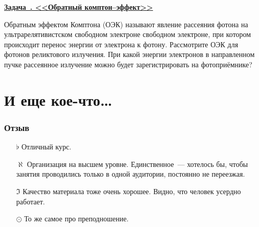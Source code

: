 \documentclass[11pt]{article}
\theoremstyle{definition}\newtheorem{defi}{Определение}
\newcounter{taskn}[section]
\newenvironment{task}[1]{%
\begin{framed}
  \noindent
  \underline{\bfseries Задача~\stepcounter{taskn}\thetaskn. <<#1>>}
  \setlength{\parindent}{0cm}
}{%
\end{framed}
}
\begin{document}
\begin{task}{Обратный комптон--эффект}

Обратным эффектом Комптона (ОЭК) называют явление рассеяния фотона на ультрарелятивистском свободном электроне свободном электроне, при котором происходит перенос энергии от электрона к фотону. Рассмотрите ОЭК для фотонов реликтового излучения. При какой энергии электронов в направленном пучке рассеянное излучение можно будет зарегистрировать на фотоприёмнике?

\end{task}


\part{И еще кое-что\dots}

\section{Отзыв}

\begin{itemize}

\item[$\flat$] Отличный курс.
\item[$\aleph$] Организация на высшем уровне. Единственное~--- хотелось бы, чтобы занятия проводились только в одной аудитории, постоянно не переезжая.
\item[$\Im$] Качество материала тоже очень хорошее. Видно, что человек усердно работает.
\item[$\odot$] То же самое про преподношение.

\end{itemize}
\end{document}
